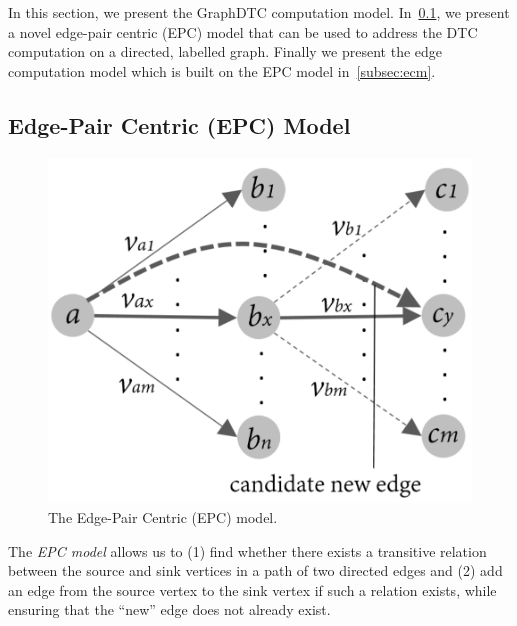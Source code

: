 \documentclass[10pt,preprint]{sigplanconf}
\begin{document}
In this section, we present the GraphDTC computation model. In~\ref{subsec:epcm}, we present a novel edge-pair centric (EPC) model that can be used to address the DTC computation on a directed, labelled graph. Finally we present the edge computation model which is built on the EPC model in~\ref{subsec:ecm}.


\subsection{Edge-Pair Centric (EPC) Model}
\label{subsec:epcm}

\begin{figure}[!htbp]
	\begin{center}
		\includegraphics[scale=0.35]{Figures/epcmodel.pdf}
	\end{center}
	\caption{The Edge-Pair Centric (EPC) model.}
	\label{fig-epcmodel}
\end{figure}

The \textit{EPC model} allows us to (1) find whether there exists a transitive relation between the source and sink vertices in a path of two directed edges and (2) add an edge from the source vertex to the sink vertex if such a relation exists, while ensuring that the ``new'' edge does not already exist.  
\end{document}
